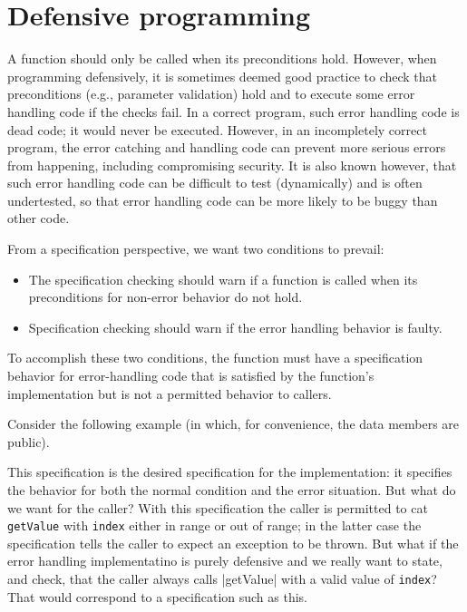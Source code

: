 \section{Defensive programming}
\label{sec:defensive}

A function should only be called when its preconditions 
hold. However, when programming defensively, it is sometimes deemed good practice to check that preconditions (e.g., parameter validation) 
hold and to execute some error handling code if the checks fail. In a correct program, such error handling code is dead code; it would
never be executed. However, in an incompletely correct program, the error catching and handling code can prevent more serious errors
from happening, including compromising security. It is also known however, that such error handling code can be difficult to test (dynamically) and is often undertested, so that error handling code can be more likely to be buggy than other code.\cite{Weimer:2004:FPR:1028976.1029011}

From a specification perspective, we want two conditions to prevail:
\begin{itemize}
	\item The specification checking should warn if a function is called when its preconditions for non-error behavior do not hold.
	\item Specification checking should warn if the error handling behavior is faulty.
\end{itemize}
To accomplish these two conditions, the function must have a specification behavior for error-handling code that is satisfied by the function's implementation but is not a permitted behavior to callers.

Consider the following example (in which, for convenience, the data members are public).



This specification is the desired specification for the implementation: it specifies the behavior for both the normal condition and the error situation.  But what do we want for the caller? With this specification the caller is permitted to cat \lstinline|getValue| with \lstinline|index| either in range or out of range; in the latter case the specification tells the caller to expect an exception to be thrown. But what if the error handling implementatino is purely defensive and we really want to state, and check, that the caller
always calls \stinline|getValue| with a valid value of \lstinline|index|? That would correspond to a specification such as this.



